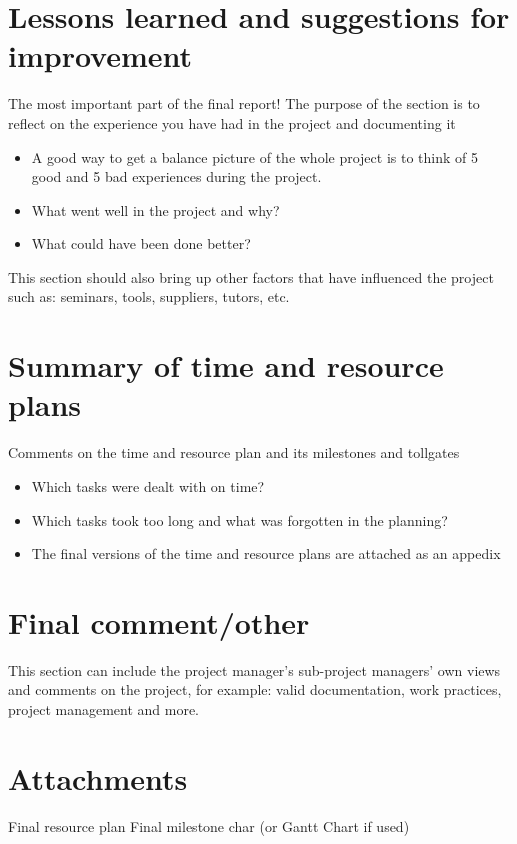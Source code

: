 \documentclass[11pt, titlepage]{article} %
\begin{document}
\section{Lessons learned and suggestions for improvement}
The most important part of the final report! The purpose of the section is to reflect on the experience you have had in the project and documenting it
\begin{itemize}
    \item A good way to get a balance picture of the whole project is to think of 5 good and 5 bad experiences during the project.
    \item What went well in the project and why?
    \item What could have been done better?
\end{itemize}

This section should also bring up other factors that have influenced the project such as: seminars, tools, suppliers, tutors, etc.


\section{Summary of time and resource plans}
Comments on the time and resource plan and its milestones and tollgates
\begin{itemize}
    \item Which tasks were dealt with on time?
    \item Which tasks took too long and what was forgotten in the planning?
    \item The final versions of the time and resource plans are attached as an appedix
\end{itemize}


\section{Final comment/other}
This section can include the project manager's sub-project managers' own views and comments on the project, for example: valid documentation, work practices, project management and more.


\section{Attachments}
Final resource plan
Final milestone char (or Gantt Chart if used)


\clearpage




\clearpage
\clearpage
\appendix
\clearpage
\end{document}
